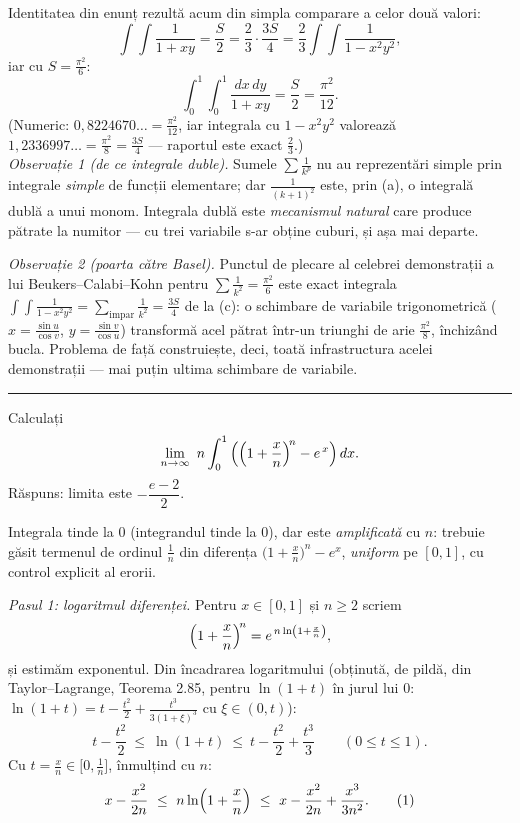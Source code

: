 Identitatea din enunț rezultă acum din simpla comparare a celor două valori:
\[ \int\!\!\int\frac{1}{1+xy}=\frac{S}{2}=\frac{2}{3}\cdot\frac{3S}{4}=\frac{2}{3}\int\!\!\int\frac{1}{1-x^{2}y^{2}} , \]
iar cu $S=\frac{\pi^{2}}{6}$:
\[ \int_{0}^{1}\!\!\int_{0}^{1}\frac{dx\,dy}{1+xy}=\frac{S}{2}=\frac{\pi^{2}}{12} . \]
(Numeric: $0{,}8224670\ldots=\frac{\pi^{2}}{12}$, iar integrala cu $1-x^{2}y^{2}$ valorează $1{,}2336997\ldots=\frac{\pi^{2}}{8}=\frac{3S}{4}$ --- raportul este exact $\frac23$.)\\[2pt]
\emph{Observație 1 (de ce integrale duble).} Sumele $\sum\frac{1}{k^{p}}$ nu au reprezentări simple prin integrale \emph{simple} de funcții elementare; dar $\frac{1}{(k+1)^{2}}$ este, prin (a), o integrală dublă a unui monom. Integrala dublă este \emph{mecanismul natural} care produce pătrate la numitor --- cu trei variabile s-ar obține cuburi, și așa mai departe.

\emph{Observație 2 (poarta către Basel).} Punctul de plecare al celebrei demonstrații a lui Beukers--Calabi--Kohn pentru $\sum\frac{1}{k^{2}}=\frac{\pi^{2}}{6}$ este exact integrala $\int\!\!\int\frac{1}{1-x^{2}y^{2}}=\sum_{\text{impar}}\frac{1}{k^{2}}=\frac{3S}{4}$ de la (c): o schimbare de variabile trigonometrică ($x=\frac{\sin u}{\cos v}$, $y=\frac{\sin v}{\cos u}$) transformă acel pătrat într-un triunghi de arie $\frac{\pi^{2}}{8}$, închizând bucla. Problema de față construiește, deci, toată infrastructura acelei demonstrații --- mai puțin ultima schimbare de variabile.
\vspace{1mm}\hrule

Calculați
\[ \lim_{n\to\infty}\ n\int_{0}^{1}\left(\Bigl(1+\frac{x}{n}\Bigr)^{\!n}-e^{\,x}\right)dx . \]
\sol Răspuns: limita este $-\dfrac{e-2}{2}$.

Integrala tinde la $0$ (integrandul tinde la $0$), dar este \emph{amplificată} cu $n$: trebuie găsit termenul de ordinul $\frac1n$ din diferența $\bigl(1+\frac xn\bigr)^{n}-e^{x}$, \emph{uniform} pe $[0,1]$, cu control explicit al erorii.

\emph{Pasul 1: logaritmul diferenței.} Pentru $x\in[0,1]$ și $n\ge2$ scriem
\[ \Bigl(1+\frac{x}{n}\Bigr)^{\!n}=e^{\,n\ln\left(1+\frac xn\right)} , \]
și estimăm exponentul. Din încadrarea logaritmului (obținută, de pildă, din Taylor--Lagrange, Teorema 2.85, pentru $\ln(1+t)$ în jurul lui $0$: $\ln(1+t)=t-\frac{t^{2}}{2}+\frac{t^{3}}{3(1+\xi)^{3}}$ cu $\xi\in(0,t)$):
\[ t-\frac{t^{2}}{2}\ \le\ \ln(1+t)\ \le\ t-\frac{t^{2}}{2}+\frac{t^{3}}{3}\qquad(0\le t\le1) . \]
Cu $t=\frac xn\in\bigl[0,\frac1n\bigr]$, înmulțind cu $n$:
\[ x-\frac{x^{2}}{2n}\ \le\ n\ln\Bigl(1+\frac xn\Bigr)\ \le\ x-\frac{x^{2}}{2n}+\frac{x^{3}}{3n^{2}} . \tag{1} \]

